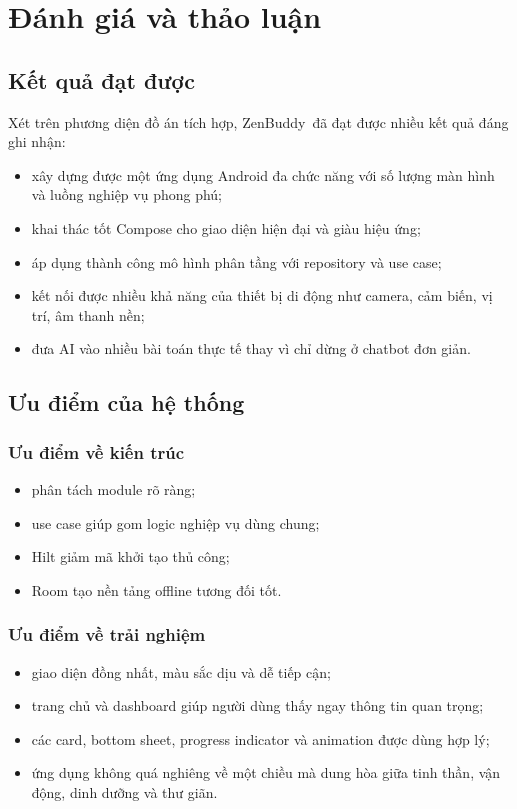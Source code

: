 \documentclass{zenbuddy-report}
\newcommand{\appname}{ZenBuddy}
\begin{document}
\chapter{Đánh giá và thảo luận}

\section{Kết quả đạt được}
Xét trên phương diện đồ án tích hợp, \appname\ đã đạt được nhiều kết quả đáng ghi nhận:
\begin{itemize}
  \item xây dựng được một ứng dụng Android đa chức năng với số lượng màn hình và luồng nghiệp vụ phong phú;
  \item khai thác tốt Compose cho giao diện hiện đại và giàu hiệu ứng;
  \item áp dụng thành công mô hình phân tầng với repository và use case;
  \item kết nối được nhiều khả năng của thiết bị di động như camera, cảm biến, vị trí, âm thanh nền;
  \item đưa AI vào nhiều bài toán thực tế thay vì chỉ dừng ở chatbot đơn giản.
\end{itemize}

\section{Ưu điểm của hệ thống}
\subsection{Ưu điểm về kiến trúc}
\begin{itemize}
  \item phân tách module rõ ràng;
  \item use case giúp gom logic nghiệp vụ dùng chung;
  \item Hilt giảm mã khởi tạo thủ công;
  \item Room tạo nền tảng offline tương đối tốt.
\end{itemize}

\subsection{Ưu điểm về trải nghiệm}
\begin{itemize}
  \item giao diện đồng nhất, màu sắc dịu và dễ tiếp cận;
  \item trang chủ và dashboard giúp người dùng thấy ngay thông tin quan trọng;
  \item các card, bottom sheet, progress indicator và animation được dùng hợp lý;
  \item ứng dụng không quá nghiêng về một chiều mà dung hòa giữa tinh thần, vận động, dinh dưỡng và thư giãn.
\end{itemize}
\end{document}
